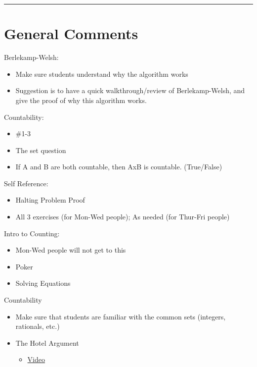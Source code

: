 \documentclass{exam}
\title{}
\date{Berlekamp-Welsh, Countability, Self Reference, Counting}
\begin{document}
\maketitle
\rule{\textwidth}{0.15em}
\fontsize{12}{15}\selectfont
\thispagestyle{empty}


\section{General Comments}
\begin{questions}
\item Berlekamp-Welsh: 
\begin{itemize}
\item Make sure students understand why the algorithm works
\item Suggestion is to have a quick walkthrough/review of Berlekamp-Welsh, and give the proof of why this algorithm works.
\end{itemize}
\item Countability: 
\begin{itemize}
\item \#1-3 
\item The set question
\item If A and B are both countable, then AxB is countable. (True/False)
\end{itemize}
\item Self Reference: 
\begin{itemize}
\item Halting Problem Proof
\item All 3 exercises (for Mon-Wed people); As needed (for Thur-Fri people)
\end{itemize}
\item Intro to Counting: 
\begin{itemize}
\item Mon-Wed people will not get to this
\item Poker
\item Solving Equations
\end{itemize}
\item Countability
\begin{itemize}
\item Make sure that students are familiar with the common sets (integers, rationals, etc.)
\item The Hotel Argument 
\begin{itemize}
\item \href{https://www.youtube.com/watch?v=6NlwpEArfwk&list=PL-XXv-cvA_iD8wQm8U0gG_Z1uHjImKXFy&index=13}{Video}

\end{itemize}
\end{itemize}
\end{questions}
\end{document}
